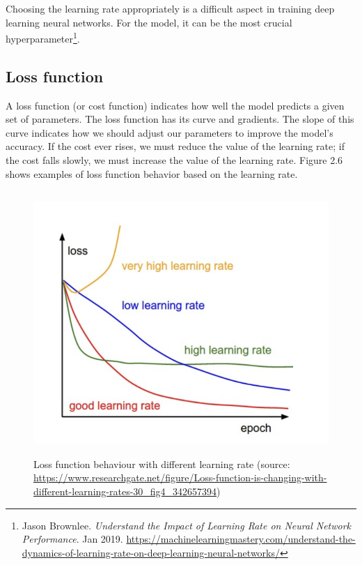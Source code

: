 Choosing the learning rate appropriately is a difficult aspect in training deep learning neural networks. For the model, it can be the most crucial hyperparameter\footnote{Jason Brownlee. \textit{Understand the Impact of Learning Rate on Neural Network Performance}. Jan 2019. \url{https://machinelearningmastery.com/understand-the-dynamics-of-learning-rate-on-deep-learning-neural-networks/}}.

\newpage
\subsection{Loss function}
\label{subsec:loss_function}
\hspace{0.5cm}A loss function (or cost function) indicates how well the model predicts a given set of parameters. The loss function has its curve and gradients. The slope of this curve indicates how we should adjust our parameters to improve the model's accuracy. If the cost ever rises, we must reduce the value of the learning rate; if the cost falls slowly, we must increase the value of the learning rate. Figure 2.6 shows examples of loss function behavior based on the learning rate.
\begin{figure}[!h]
	\centering
	\includegraphics[width=\linewidth, height=10cm,keepaspectratio]{figures/loss function DL.png}
   \caption{Loss function behaviour with different learning rate (source: \url{https://www.researchgate.net/figure/Loss-function-is-changing-with-different-learning-rates-30_fig4_342657394})}
\end{figure}

